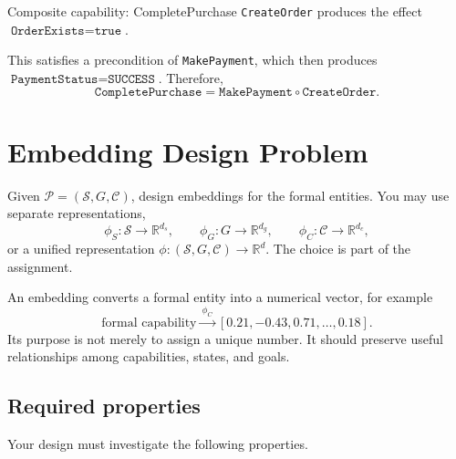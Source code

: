 \documentclass[11pt]{article}
\newcommand{\code}[1]{\texttt{#1}}
\newcommand{\R}{\mathbb{R}}
\newcommand{\true}{\texttt{true}}
\begin{document}
\begin{examplebox}{Composite capability: CompletePurchase}
\code{CreateOrder} produces the effect
\(\code{OrderExists}=\true\).

This satisfies a precondition of \code{MakePayment}, which then produces
\(\code{PaymentStatus}=\code{SUCCESS}\). Therefore,
\[
  \code{CompletePurchase}=\code{MakePayment}\circ\code{CreateOrder}.
\]
\end{examplebox}

\section{Embedding Design Problem}

Given \(\mathcal{P}=(\mathcal{S},G,\mathcal{C})\), design embeddings for the formal
entities. You may use separate representations,
\[
  \phi_S:\mathcal{S}\rightarrow\R^{d_s},\qquad
  \phi_G:G\rightarrow\R^{d_g},\qquad
  \phi_C:\mathcal{C}\rightarrow\R^{d_c},
\]
or a unified representation \(\phi:(\mathcal{S},G,\mathcal{C})\rightarrow\R^d\). The
choice is part of the assignment.

An embedding converts a formal entity into a numerical vector, for example
\[
 \text{formal capability}\xrightarrow{\ \phi_C\ }
 [0.21,-0.43,0.71,\ldots,0.18].
\]
Its purpose is not merely to assign a unique number. It should preserve useful
relationships among capabilities, states, and goals.

\subsection{Required properties}

Your design must investigate the following properties.
\end{document}
